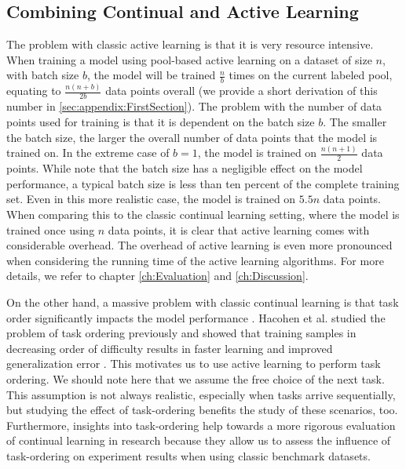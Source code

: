 \subsection{Combining Continual and Active Learning}
\label{sec:Methodology:CombiningCLandAL}
The problem with classic active learning is that it is very resource intensive. When training a model using pool-based active learning on a dataset of size $n$,
with batch size $b$, the model will be trained $\frac{n}{b}$ times on the current labeled pool, equating to $\frac{n(n+b)}{2b}$ data points overall (we provide a
short derivation of this number in \ref{sec:appendix:FirstSection}). The problem with the number of data points used for training is that it is dependent on the
batch size $b$. The smaller the batch size, the larger the overall number of data points that the model is trained on. In the extreme case of $b=1$, the model
is trained on $\frac{n(n+1)}{2}$ data points. While \cite{beck2021effective} note that the batch size has a negligible effect on the model performance, a typical
batch size is less than ten percent of the complete training set. Even in this more realistic case, the model is trained on $5.5n$ data points. When
comparing this to the classic continual learning setting, where the model is trained once using $n$ data points, it is clear that active learning comes with
considerable overhead. The overhead of active learning is even more pronounced when considering the running time of the active learning algorithms.
For more details, we refer to chapter \ref{ch:Evaluation} and \ref{ch:Discussion}. \par
On the other hand, a massive problem with classic continual learning is that task order significantly impacts the model performance \cite{bell2022effect}.
Hacohen et al. studied the problem of task ordering previously and showed that training samples in decreasing order of difficulty results in faster learning and
improved generalization error \cite{hacohen2019power}. This motivates us to use active learning to perform task ordering. We should note here that we
assume the free choice of the next task. This assumption is not always realistic, especially when tasks arrive sequentially, but studying the effect of task-ordering
benefits the study of these scenarios, too. Furthermore, insights into task-ordering help towards a more rigorous evaluation of continual learning in 
research because they allow us to assess the influence of task-ordering on experiment results when using classic benchmark datasets. \par
